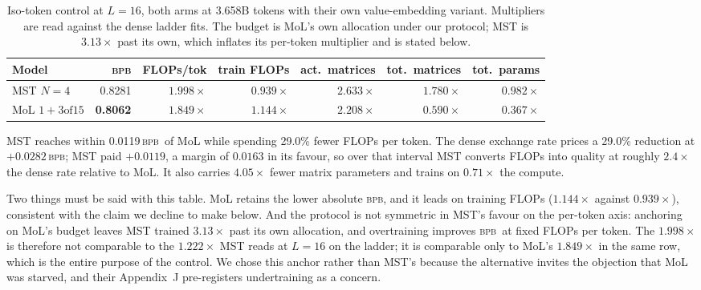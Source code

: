 \documentclass{article}
\newcommand{\bpb}{\textsc{bpb}}
\newcommand{\nsub}{N}
\begin{document}
\begin{table}[t]
\caption{Iso-token control at $L{=}16$, both arms at 3.658B tokens with their own
value-embedding variant. Multipliers are read against the dense ladder fits.
The budget is MoL's own allocation under our protocol; MST is $3.13\times$ past its
own, which inflates its per-token multiplier and is stated below.}
\label{tab:isotoken16}
\begin{center}
\begin{small}
\setlength{\tabcolsep}{4.5pt}
\begin{tabular}{lrrrrrr}
\toprule
Model & \bpb & FLOPs/tok & train FLOPs & act.\ matrices & tot.\ matrices & tot.\ params \\
\midrule
MST $\nsub{=}4$        & 0.8281 & $\mathbf{1.998\times}$ & $0.939\times$
                       & $\mathbf{2.633\times}$ & $\mathbf{1.780\times}$ & $\mathbf{0.982\times}$ \\
MoL $1{+}3\text{of}15$ & \textbf{0.8062} & $1.849\times$ & $\mathbf{1.144\times}$
                       & $2.208\times$ & $0.590\times$ & $0.367\times$ \\
\bottomrule
\end{tabular}
\end{small}
\end{center}
MST reaches within 0.0119\,\bpb\ of MoL while spending 29.0\% fewer FLOPs per token.
The dense exchange rate prices a 29.0\% reduction at $+0.0282$\,\bpb; MST paid
$+0.0119$, a margin of $0.0163$ in its favour, so over that interval MST converts
FLOPs into quality at roughly $2.4\times$ the dense rate relative to MoL. It also
carries $4.05\times$ fewer matrix parameters and trains on $0.71\times$ the compute.
\end{table}

Two things must be said with this table. MoL retains the lower absolute \bpb, and
it leads on training FLOPs ($1.144\times$ against $0.939\times$), consistent with
the claim we decline to make below. And the protocol is not symmetric in MST's
favour on the per-token axis: anchoring on MoL's budget leaves MST trained
$3.13\times$ past its own allocation, and overtraining improves \bpb\ at
fixed FLOPs per token. The $1.998\times$ is therefore not comparable to the
$1.222\times$ MST reads at $L{=}16$ on the ladder; it is comparable only to MoL's
$1.849\times$ in the same row, which is the entire purpose of the control. We chose
this anchor rather than MST's because the alternative invites the objection that MoL
was starved, and their Appendix~J pre-registers undertraining as a concern.
\end{document}
